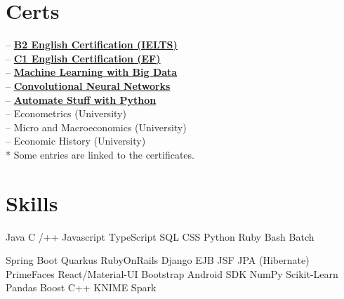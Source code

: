 \documentclass[]{CV-JuanCamiloFlorez}
\begin{document}
\begin{minipage}[t]{0.33\textwidth}
\section{Certs}
-- \textbf{\href{file://locationpath}{B2 English Certification (IELTS)}} \\
-- \textbf{\href{https://www.efset.org/cert/j8ebfw}{C1 English Certification (EF)}} \\
-- \textbf{\href{https://www.coursera.org/account/accomplishments/certificate/8MS64GGYWDT5?utm_medium=certificate&utm_source=link&utm_campaign=copybutton_certificate}{Machine Learning with Big Data}} \\
-- \textbf{\href{https://www.coursera.org/account/accomplishments/certificate/KFN2XJC2KP92?utm_medium=certificate&utm_source=link&utm_campaign=copybutton_certificate}{Convolutional Neural Networks}} \\
-- \textbf{\href{https://www.udemy.com/certificate/UC-ZHLLMBQA}{Automate Stuff with Python}} \\
-- Econometrics (University) \\
-- Micro and Macroeconomics (University) \\
-- Economic History (University) \\
\smallskip
\scriptsize{* Some entries are linked to the certificates.}
\sectionsep


\section{Skills}
    \textbullet{} Java
    \textbullet{} C /++
    \textbullet{} Javascript
    \textbullet{} TypeScript
    \textbullet{} SQL
    \textbullet{} CSS
    \textbullet{} Python
    \textbullet{} Ruby
    \textbullet{} Bash
    \textbullet{} Batch

    \textbullet{} Spring Boot
    \textbullet{} Quarkus
    \textbullet{} RubyOnRails
    \textbullet{} Django
    \textbullet{} EJB JSF JPA (Hibernate) PrimeFaces
    \textbullet{} React/Material-UI
    \textbullet{} Bootstrap
    \textbullet{} Android SDK
    \textbullet{} NumPy
    \textbullet{} Scikit-Learn
    \textbullet{} Pandas
    \textbullet{} Boost C++
    \textbullet{} KNIME
    \textbullet{} Spark


\end{minipage}
\end{document}
